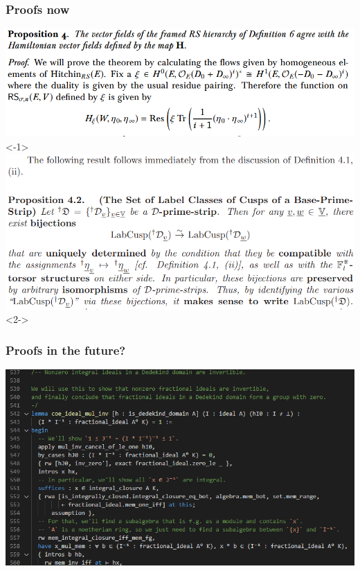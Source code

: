 \documentclass{beamer}
\begin{document}
\begin{frame}
    \frametitle{Proofs now}
    \begin{center}
        \includegraphics[scale=.4]{img/mypaper.png}<-1>
        \pause
        \includegraphics[scale=.4]{img/IUT.png}<2->
    \end{center}
\end{frame}

\begin{frame}
    \frametitle{Proofs in the future?}
    \begin{center}
        \includegraphics[scale=.5]{img/lean.png}
    \end{center}
\end{frame}
\end{document}
